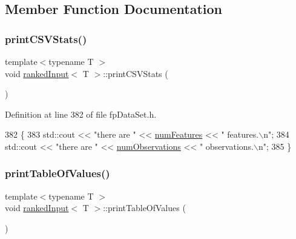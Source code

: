 \subsection{Member Function Documentation}
\mbox{\label{classrankedInput_a5a63105754b648c5047f887f5ca9b3b6}} 
\subsubsection{\texorpdfstring{print\+C\+S\+V\+Stats()}{printCSVStats()}}
{\footnotesize\ttfamily template$<$typename T $>$ \\
void \hyperlink{classrankedInput}{ranked\+Input}$<$ T $>$\+::print\+C\+S\+V\+Stats (\begin{DoxyParamCaption}{ }\end{DoxyParamCaption})\hspace{0.3cm}{\ttfamily [inline]}}



Definition at line 382 of file fp\+Data\+Set.\+h.


\begin{DoxyCode}
382                             \{
383             std::cout << \textcolor{stringliteral}{"there are "} << \hyperlink{classrankedInput_ad86e2ad8f4044697450ddfdb15aa10a9}{numFeatures} << \textcolor{stringliteral}{" features.\(\backslash\)n"};
384             std::cout << \textcolor{stringliteral}{"there are "} << \hyperlink{classrankedInput_a7b0e6ebcf6fa2fcd0b08918e3b3020be}{numObservations} << \textcolor{stringliteral}{" observations.\(\backslash\)n"};
385         \}
\end{DoxyCode}
\mbox{\label{classrankedInput_a72fc3f9bf4d358babdf84c96617417f3}} 
\subsubsection{\texorpdfstring{print\+Table\+Of\+Values()}{printTableOfValues()}}
{\footnotesize\ttfamily template$<$typename T $>$ \\
void \hyperlink{classrankedInput}{ranked\+Input}$<$ T $>$\+::print\+Table\+Of\+Values (\begin{DoxyParamCaption}{ }\end{DoxyParamCaption})\hspace{0.3cm}{\ttfamily [inline]}}



